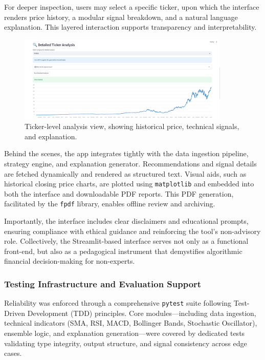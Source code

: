 For deeper inspection, users may select a specific ticker, upon which the interface renders price history, a modular signal breakdown, and a natural language explanation. This layered interaction supports transparency and interpretability.

\begin{figure}[ht]
    \centering
    \includegraphics[width=0.9\textwidth]{assets/ui2-ticker_analysis.png}
    \caption{\small Ticker-level analysis view, showing historical price, technical signals, and explanation.}
    \label{fig:ui-ticker-analysis}
\end{figure}

Behind the scenes, the app integrates tightly with the data ingestion pipeline, strategy engine, and explanation generator. Recommendations and signal details are fetched dynamically and rendered as structured text. Visual aids, such as historical closing price charts, are plotted using \texttt{matplotlib} and embedded into both the interface and downloadable PDF reports. This PDF generation, facilitated by the \texttt{fpdf} library, enables offline review and archiving.

Importantly, the interface includes clear disclaimers and educational prompts, ensuring compliance with ethical guidance and reinforcing the tool’s non-advisory role. Collectively, the Streamlit-based interface serves not only as a functional front-end, but also as a pedagogical instrument that demystifies algorithmic financial decision-making for non-experts.


\subsubsection{Testing Infrastructure and Evaluation Support}

Reliability was enforced through a comprehensive \texttt{pytest} suite following Test-Driven Development (TDD) principles. Core modules—including data ingestion, technical indicators (SMA, RSI, MACD, Bollinger Bands, Stochastic Oscillator), ensemble logic, and explanation generation—were covered by dedicated tests validating type integrity, output structure, and signal consistency across edge cases.

